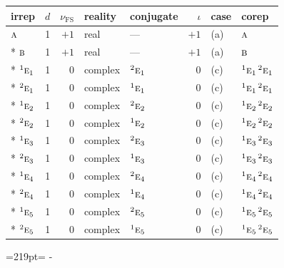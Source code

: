 \documentclass[10pt,a4paper]{article}
\newcommand{\needspace}[1]{\par\penalty-100\begingroup\dimen0=#1\relax\dimen2=\pagegoal
  \advance\dimen2-\pagetotal\ifdim\dimen0>\dimen2\relax\ifdim\dimen2>0pt\vfil\break\fi\fi
  \endgroup}
\numberwithin{equation}{section}
\newcommand{\irr}[1]{\text{\normalfont\scshape #1}}
\newcommand{\conjpair}[1]{{}^{#1}}
\newcommand{\fsind}{\nu_{\mathrm{FS}}}
\begin{document}
{\small\renewcommand{\arraystretch}{1.25}\setlength{\tabcolsep}{4pt}\begin{longtable}{@{}lrrllrll@{}}\toprule
irrep & $d$ & $\fsind$ & reality & conjugate & $\iota$ & case & corep\\\midrule\endhead
\bottomrule\endfoot\endlastfoot
$\irr{a}$ & 1 & $+1$ & real & --- & $+1$ & (a) & $\irr{a}$\\*
$\irr{b}$ & 1 & $+1$ & real & --- & $+1$ & (a) & $\irr{b}$\\*
$\conjpair{1}\irr{e}_{1}$ & 1 & $0$ & complex & $\conjpair{2}\irr{e}_{1}$ & $0$ & (c) & $\conjpair{1}\irr{e}_{1}\,\conjpair{2}\irr{e}_{1}$\\*
$\conjpair{2}\irr{e}_{1}$ & 1 & $0$ & complex & $\conjpair{1}\irr{e}_{1}$ & $0$ & (c) & $\conjpair{1}\irr{e}_{1}\,\conjpair{2}\irr{e}_{1}$\\*
$\conjpair{1}\irr{e}_{2}$ & 1 & $0$ & complex & $\conjpair{2}\irr{e}_{2}$ & $0$ & (c) & $\conjpair{1}\irr{e}_{2}\,\conjpair{2}\irr{e}_{2}$\\*
$\conjpair{2}\irr{e}_{2}$ & 1 & $0$ & complex & $\conjpair{1}\irr{e}_{2}$ & $0$ & (c) & $\conjpair{1}\irr{e}_{2}\,\conjpair{2}\irr{e}_{2}$\\*
$\conjpair{1}\irr{e}_{3}$ & 1 & $0$ & complex & $\conjpair{2}\irr{e}_{3}$ & $0$ & (c) & $\conjpair{1}\irr{e}_{3}\,\conjpair{2}\irr{e}_{3}$\\*
$\conjpair{2}\irr{e}_{3}$ & 1 & $0$ & complex & $\conjpair{1}\irr{e}_{3}$ & $0$ & (c) & $\conjpair{1}\irr{e}_{3}\,\conjpair{2}\irr{e}_{3}$\\*
$\conjpair{1}\irr{e}_{4}$ & 1 & $0$ & complex & $\conjpair{2}\irr{e}_{4}$ & $0$ & (c) & $\conjpair{1}\irr{e}_{4}\,\conjpair{2}\irr{e}_{4}$\\*
$\conjpair{2}\irr{e}_{4}$ & 1 & $0$ & complex & $\conjpair{1}\irr{e}_{4}$ & $0$ & (c) & $\conjpair{1}\irr{e}_{4}\,\conjpair{2}\irr{e}_{4}$\\*
$\conjpair{1}\irr{e}_{5}$ & 1 & $0$ & complex & $\conjpair{2}\irr{e}_{5}$ & $0$ & (c) & $\conjpair{1}\irr{e}_{5}\,\conjpair{2}\irr{e}_{5}$\\*
$\conjpair{2}\irr{e}_{5}$ & 1 & $0$ & complex & $\conjpair{1}\irr{e}_{5}$ & $0$ & (c) & $\conjpair{1}\irr{e}_{5}\,\conjpair{2}\irr{e}_{5}$\\
\bottomrule\end{longtable}}
\needspace{219pt}
\end{document}
